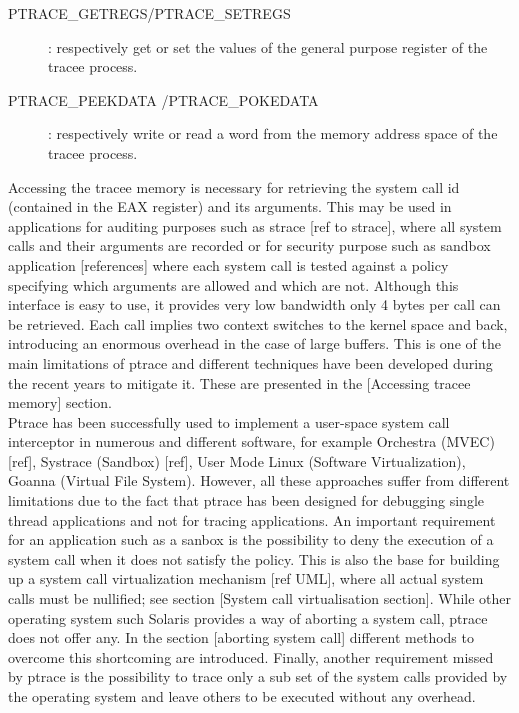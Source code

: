 \begin{description}
\item[PTRACE\_GETREGS/PTRACE\_SETREGS] :
	respectively get or set the values of the general purpose register of the tracee process.
\item[PTRACE\_PEEKDATA /PTRACE\_POKEDATA] :
	 respectively write or read a word from the memory address space of the tracee process.
\end{description}

Accessing the tracee memory is necessary for retrieving the system call id (contained in the EAX register) and its arguments. This may be used in applications for auditing purposes such as strace [ref to strace], where all system calls and their arguments are recorded or for security purpose such as sandbox application [references] where each system call is tested against a policy specifying which arguments are allowed and which are not.   Although this interface is easy to use, it provides very low bandwidth only 4 bytes per call can be retrieved. Each call implies two context switches to the kernel space and back, introducing an enormous overhead in the case of large buffers.  This is one of the main limitations of ptrace and different techniques have been developed during the recent years to mitigate it. These are presented in the [Accessing tracee memory] section.  \\
Ptrace has been successfully used to implement a user-space system call interceptor in numerous and different software, for example Orchestra (MVEC) [ref], Systrace (Sandbox) [ref], User Mode Linux (Software Virtualization), Goanna (Virtual File System). However, all these approaches suffer from different limitations due to the fact that ptrace has been designed for debugging single thread applications and not for tracing applications.  An important requirement for an application such as a sanbox is the possibility to deny the execution of a system call when it does not satisfy the policy. This is also the base for building up a system call virtualization mechanism [ref UML], where all actual system calls must be nullified; see section [System call virtualisation section]. While other operating system such Solaris provides a way of aborting a system call, ptrace does not offer any.  In the section [aborting system call] different methods to overcome this shortcoming are introduced.  
Finally, another requirement missed by ptrace is the possibility to trace only a sub set of the system calls provided by the operating system and leave others to be executed without any overhead. \\
